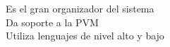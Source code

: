 \documentclass[preview]{standalone}
\begin{document}
Es el gran organizador del sistema\\Da soporte a la PVM\\Utiliza lenguajes de nivel alto y bajo\\
\end{document}
